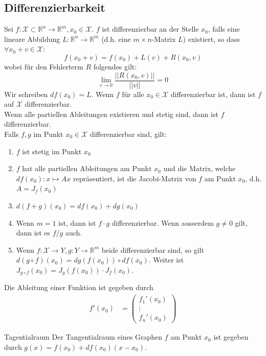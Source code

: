 \documentclass[a4paper,10pt]{article}
\def\R{\mathbb{R}}
\def\X{\mathcal{X}}
\begin{document}
\subsection{Differenzierbarkeit}
Sei \(f: \X \subset \R^n \to \R^m, x_0 \in \X\). \(f\) ist differenzierbar an der Stelle \(x_0\), falls eine lineare Abbildung \(L: \R^n \to \R^m\) (d.h. eine \(m \times n\)-Matrix \(L\)) existiert, so dass \(\forall x_0 + v \in \X\):
\[f(x_0 + v) = f(x_0) + L(v) + R(x_0,v)\]
wobei für den Fehlerterm \(R\) folgendes gilt: 
\[\lim_{v \to 0} \frac{||R(x_0,v)||}{||v||} = 0\]
Wir schreiben \(df(x_0) = L\). Wenn \(f\) für alle \(x_0 \in \X\) differenzierbar ist, dann ist \(f\) auf \(\X\) differenzierbar. \\
Wenn alle partiellen Ableitungen existieren und stetig sind, dann ist \(f\) differenzierbar.\\
Falls \(f,g\) im Punkt \(x_0 \in \X\) differenzierbar sind, gilt:
\begin{enumerate}
  \item \(f\) ist stetig im Punkt \(x_0\)
  \item \(f\) hat alle partiellen Ableitungen am Punkt \(x_0\) und die Matrix, welche \(df(x_0): x \mapsto Ax\) repräsentiert, ist die Jacobi-Matrix von \(f\) am Punkt \(x_0\), d.h. \(A = J_f(x_0)\)
  \item \(d(f+g)(x_0) = df(x_0) + dg(x_0)\)
  \item Wenn \(m = 1\) ist, dann ist \(f\cdot g\) differenzierbar. Wenn ausserdem \(g \ne 0\) gilt, dann ist es \(f/g\) auch.
  \item Wenn \(f: \X \to Y, g: Y \to \R^m\) beide differenzierbar sind, so gilt \(d(g \circ f)(x_0) = dg(f(x_0)) \circ df(x_0)\). 
  Weiter ist \(J_{g \circ f}(x_0) = J_g(f(x_0)) \cdot J_f(x_0)\).
\end{enumerate}
Die Ableitung einer Funktion ist gegeben durch
\begin{align*}
  f'(x_0) &= \begin{pmatrix}
    f_1'(x_0)\\
    \vdots\\
    f_n'(x_0)
  \end{pmatrix}
\end{align*}
\begin{subbox}{Tagentialraum}
  Der Tangentialraum eines Graphen \(f\) am Punkt \(x_0\) ist gegeben durch \(g(x) = f(x_0) + df(x_0)(x-x_0)\).
\end{subbox}
\end{document}
